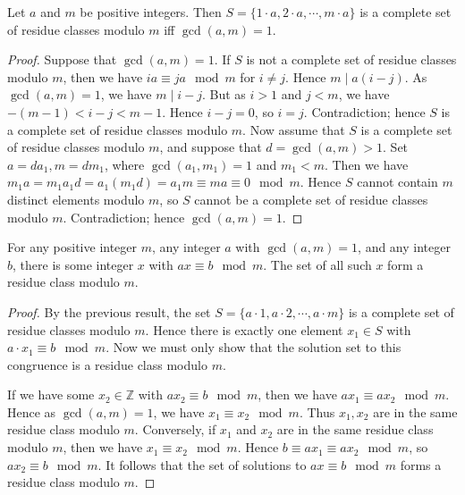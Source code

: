 \begin{prb}
Let $a$ and $m$ be positive integers.  Then $S = \{1\cdot a,2\cdot a,\cdots,m\cdot a\}$ is a complete set of residue classes modulo $m$ iff $\gcd{(a,m)} = 1$.
\begin{proof}
Suppose that $\gcd{(a,m)} = 1$.  If $S$ is not a complete set of
residue classes modulo $m$, then we have $ia\equiv ja\mod{m}$ for $i
\neq j$.  Hence $m\mid a(i-j)$.  As $\gcd{(a,m)} = 1$, we have
$m\mid i-j$.  But as $i > 1$ and $j < m$, we have $-(m-1) < i-j <
m-1$.  Hence $i-j = 0$, so $i = j$.  Contradiction; hence $S$ is a
complete set of residue classes modulo $m$. Now assume that $S$ is a
complete set of residue classes modulo $m$, and suppose that $d =
\gcd{(a,m)} > 1$.  Set $a = da_1, m = dm_1$, where $\gcd{(a_1,m_1)}
= 1$ and $m_1 < m$.  Then we have $m_1a = m_1a_1d = a_1(m_1d) = a_1m
\equiv ma \equiv 0\mod{m}$.  Hence $S$ cannot contain $m$ distinct
elements modulo $m$, so $S$ cannot be a complete set of residue
classes modulo $m$.  Contradiction; hence $\gcd{(a,m)} = 1$.
\end{proof}
\end{prb}
\begin{prb}
For any positive integer $m$, any integer $a$ with $\gcd{(a,m)} = 1$, and any integer $b$, there is some integer $x$ with $ax\equiv b\mod{m}$.  The set of all such $x$ form a residue class modulo $m$.
\begin{proof}
By the previous result, the set $S = \{a\cdot1,a\cdot2,\cdots,a\cdot m\}$ is a complete set of residue classes modulo $m$.  Hence there is exactly one element $x_1 \in S$ with $a\cdot x_1 \equiv b\mod{m}$.
  Now we must only show that the solution set to this congruence is a residue class modulo $m$.

If we have some $x_2 \in \mathbb{Z}$ with $ax_2 \equiv b\mod{m}$,
then we have $ax_1\equiv ax_2\mod{m}$.  Hence as $\gcd{(a,m)} = 1$,
we have $x_1\equiv x_2\mod{m}$.  Thus $x_1, x_2$ are in the same
residue class modulo $m$.  Conversely, if $x_1$ and $x_2$ are in the
same residue class modulo $m$, then we have $x_1 \equiv x_2\mod{m}$.
Hence $b\equiv ax_1\equiv ax_2\mod{m}$, so $ax_2\equiv b\mod{m}$. It
follows that the set of solutions to $ax\equiv b\mod{m}$ forms a
residue class modulo $m$.
\end{proof}
\end{prb}
